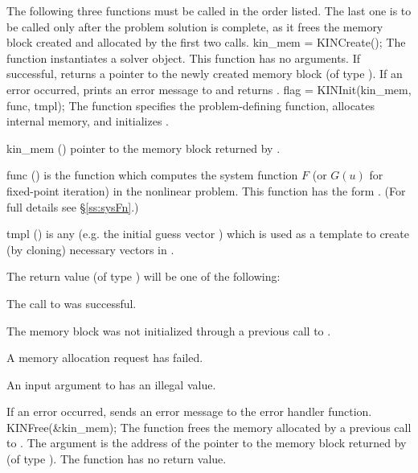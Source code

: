 The following three functions must be called in the order listed. The last one
is to be called only after the problem solution is complete, as it frees the
{\kinsol} memory block created and allocated by the first two calls.
{
  kin\_mem = KINCreate();
}
{
  The function  instantiates a {\kinsol} solver object.
}
{
  This function has no arguments.
}
{
  If successful,  returns a pointer to the newly created 
  {\kinsol} memory block (of type ).
  If an error occurred,  prints an error message to 
  and returns .
}
{}
{
flag = KINInit(kin\_mem, func, tmpl);
}
{
  The function  specifies the problem-defining
  function, allocates internal memory, and initializes {\kinsol}.
}
{
  \begin{args}
  \item[kin\_mem] ()
    pointer to the {\kinsol} memory block returned by .
  \item[func] ()
    is the {\C} function which computes the system function $F$ 
    (or $G(u)$ for fixed-point iteration) in the nonlinear
    problem.  This function has the form . 
    (For full details see \S\ref{ss:sysFn}.)
  \item[tmpl] ()
    is any  (e.g. the initial guess vector ) which is used
    as a template to create (by cloning) necessary vectors in .
  \end{args}
}
{
  The return value  (of type ) will be one of the following:
  \begin{args}
  \item[\Id{KIN\_SUCCESS}]
    The call to  was successful.
  \item[\Id{KIN\_MEM\_NULL}] 
    The {\kinsol} memory block was not initialized through a previous call
    to .
  \item[\Id{KIN\_MEM\_FAIL}] 
    A memory allocation request has failed.
  \item[\Id{KIN\_ILL\_INPUT}] 
    An input argument to  has an illegal value.
  \end{args}
}
{
  If an error occurred,  sends an error message to the
  error handler function.
}
{
  KINFree(\&kin\_mem);
}
{
  The function  frees the memory allocated by
  a previous call to .
}
{
  The argument is the address of the pointer to the {\kinsol} memory block
  returned by  (of type ).
}
{
  The function  has no return value.
}
{}

